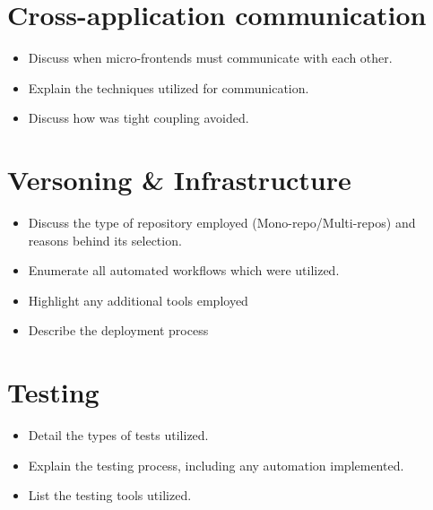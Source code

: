 \section{Cross-application communication}
\begin{itemize}
   \item Discuss when micro-frontends must communicate with each other.
   \item Explain the techniques utilized for communication.
   \item Discuss how was tight coupling avoided.
\end{itemize}

\section{Versoning \& Infrastructure}
\begin{itemize}
   \item Discuss the type of repository employed (Mono-repo/Multi-repos) and reasons behind its selection.
   \item Enumerate all automated workflows which were utilized.
   \item Highlight any additional tools employed
   \item Describe the deployment process
\end{itemize}

\section{Testing}
\begin{itemize}
   \item Detail the types of tests utilized.
   \item  Explain the testing process, including any automation implemented.
   \item List the testing tools utilized.
\end{itemize}
